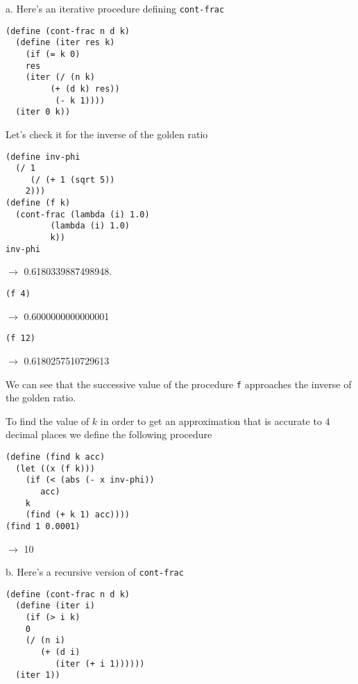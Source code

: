 \documentclass[a4paper,12pt]{article}
\begin{document}
\noindent
a. Here's an iterative procedure defining \lstinline!cont-frac!
\begin{lstlisting}
(define (cont-frac n d k)
  (define (iter res k)
    (if (= k 0)
	res
	(iter (/ (n k)
		 (+ (d k) res))
	      (- k 1))))
  (iter 0 k))
\end{lstlisting}
Let's check it for the inverse of the golden ratio
\begin{lstlisting}
(define inv-phi
  (/ 1
     (/ (+ 1 (sqrt 5))
	2)))
(define (f k)
  (cont-frac (lambda (i) 1.0)
	     (lambda (i) 1.0)
	     k))
inv-phi
\end{lstlisting}
$\rightarrow$ 0.6180339887498948.
\begin{lstlisting}
(f 4)
\end{lstlisting}
$\rightarrow$ 0.6000000000000001
\begin{lstlisting}
(f 12)
\end{lstlisting}
$\rightarrow$ 0.6180257510729613

\medskip We can see that the successive value of the procedure
\lstinline!f! approaches the inverse of the golden ratio.

To find the value of $k$ in order to get an approximation that is
accurate to $4$ decimal places we define the following procedure
\begin{lstlisting}
(define (find k acc)
  (let ((x (f k)))
    (if (< (abs (- x inv-phi))
	   acc)
	k
	(find (+ k 1) acc))))
(find 1 0.0001)
\end{lstlisting}
$\rightarrow$ 10

\medskip \noindent
b.  Here's a recursive version of \lstinline!cont-frac!
\begin{lstlisting}
(define (cont-frac n d k)
  (define (iter i)
    (if (> i k)
	0
	(/ (n i)
	   (+ (d i)
	      (iter (+ i 1))))))
  (iter 1))
\end{lstlisting}
\end{document}
